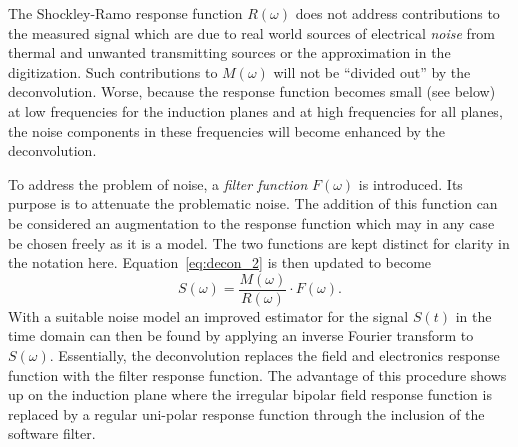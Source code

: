 The Shockley-Ramo response function $R(\omega)$ does not address
contributions to the measured signal which are due to real world
sources of electrical \textit{noise} from thermal and unwanted transmitting
sources or the approximation in the digitization.
Such contributions to $M(\omega)$ will not be ``divided out'' by the deconvolution.
Worse, because the response function becomes small (see below) at low 
frequencies for the induction planes and at high frequencies for all
planes, the noise components in these frequencies will become
enhanced by the deconvolution.

To address the problem of noise, a \textit{filter function} $F(\omega)$ is
introduced.  Its purpose is to attenuate the problematic noise.  The
addition of this function can be considered an augmentation to the
response function which may in any case be chosen freely as it is a model.  
The two functions are kept distinct for clarity in the notation here.
Equation~\ref{eq:decon_2} is then updated to become
\begin{equation}\label{eq:decon_filt}
S(\omega) = \frac{M(\omega)}{R(\omega)} \cdot F(\omega).
\end{equation}
With a suitable noise model an improved estimator for the signal
$S(t)$ in the time domain can then be found by applying an inverse Fourier 
transform to $S(\omega)$.  Essentially, the deconvolution replaces the field and 
electronics response function with the filter response function. The 
advantage of this procedure shows up on the induction plane where the irregular bipolar 
field response function is replaced by a regular uni-polar response function through
the inclusion of the software filter. 


